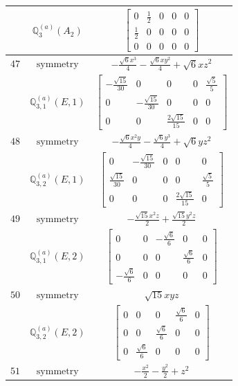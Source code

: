 \documentclass[fleqn,8pt,landscape]{jsarticle}
\begin{document}
\begin{longtable}{ccc}
$  $ & $ \mathbb{Q}_{3}^{(a)}(A_{2}) $ & $ \begin{bmatrix} 0 & \frac{1}{2} & 0 & 0 & 0 \\ \frac{1}{2} & 0 & 0 & 0 & 0 \\ 0 & 0 & 0 & 0 & 0 \end{bmatrix} $ \\ \hline
$ 47 $ & $ \text{symmetry} $ & $ - \frac{\sqrt{6} x^{3}}{4} - \frac{\sqrt{6} x y^{2}}{4} + \sqrt{6} x z^{2} $ \\
$  $ & $ \mathbb{Q}_{3,1}^{(a)}(E,1) $ & $ \begin{bmatrix} - \frac{\sqrt{15}}{30} & 0 & 0 & 0 & \frac{\sqrt{5}}{5} \\ 0 & - \frac{\sqrt{15}}{30} & 0 & 0 & 0 \\ 0 & 0 & \frac{2 \sqrt{15}}{15} & 0 & 0 \end{bmatrix} $ \\ \hline
$ 48 $ & $ \text{symmetry} $ & $ - \frac{\sqrt{6} x^{2} y}{4} - \frac{\sqrt{6} y^{3}}{4} + \sqrt{6} y z^{2} $ \\
$  $ & $ \mathbb{Q}_{3,2}^{(a)}(E,1) $ & $ \begin{bmatrix} 0 & - \frac{\sqrt{15}}{30} & 0 & 0 & 0 \\ \frac{\sqrt{15}}{30} & 0 & 0 & 0 & \frac{\sqrt{5}}{5} \\ 0 & 0 & 0 & \frac{2 \sqrt{15}}{15} & 0 \end{bmatrix} $ \\ \hline
$ 49 $ & $ \text{symmetry} $ & $ - \frac{\sqrt{15} x^{2} z}{2} + \frac{\sqrt{15} y^{2} z}{2} $ \\
$  $ & $ \mathbb{Q}_{3,1}^{(a)}(E,2) $ & $ \begin{bmatrix} 0 & 0 & - \frac{\sqrt{6}}{6} & 0 & 0 \\ 0 & 0 & 0 & \frac{\sqrt{6}}{6} & 0 \\ - \frac{\sqrt{6}}{6} & 0 & 0 & 0 & 0 \end{bmatrix} $ \\ \hline
$ 50 $ & $ \text{symmetry} $ & $ \sqrt{15} x y z $ \\
$  $ & $ \mathbb{Q}_{3,2}^{(a)}(E,2) $ & $ \begin{bmatrix} 0 & 0 & 0 & \frac{\sqrt{6}}{6} & 0 \\ 0 & 0 & \frac{\sqrt{6}}{6} & 0 & 0 \\ 0 & \frac{\sqrt{6}}{6} & 0 & 0 & 0 \end{bmatrix} $ \\ \hline
$ 51 $ & $ \text{symmetry} $ & $ - \frac{x^{2}}{2} - \frac{y^{2}}{2} + z^{2} $ \\

\end{longtable}
\end{document}
